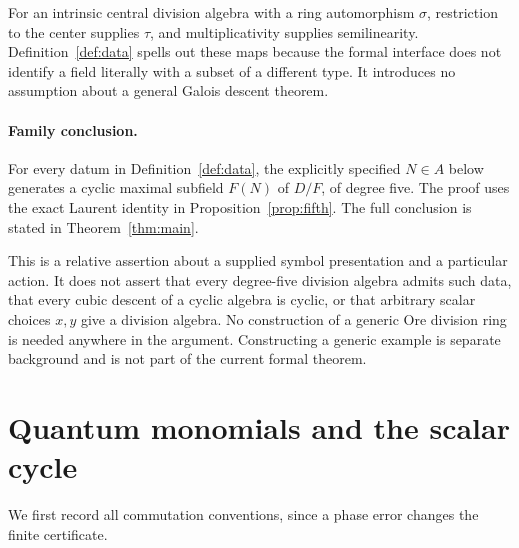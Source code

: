 \documentclass[11pt,letterpaper]{article}
\theoremstyle{definition}
\theoremstyle{remark}
\begin{document}
For an intrinsic central division algebra with a ring automorphism
$\sigma$, restriction to the center supplies $\tau$, and multiplicativity
supplies semilinearity. Definition~\ref{def:data} spells out these maps
because the formal interface does not identify a field literally with a
subset of a different type. It introduces no assumption about a general
Galois descent theorem.

\paragraph{Family conclusion.}
For every datum in Definition~\ref{def:data}, the explicitly specified
$N\in A$ below generates a cyclic maximal subfield $F(N)$ of $D/F$, of
degree five. The proof uses the exact Laurent identity in
Proposition~\ref{prop:fifth}. The full conclusion is stated in
Theorem~\ref{thm:main}.

This is a relative assertion about a supplied symbol presentation and a
particular action. It does not assert that every degree-five division
algebra admits such data, that every cubic descent of a cyclic algebra is
cyclic, or that arbitrary scalar choices $x,y$ give a division algebra.
No construction of a generic Ore division ring is needed anywhere in the
argument. Constructing a generic example is separate background and is not
part of the current formal theorem.

\section{Quantum monomials and the scalar cycle}\label{sec:monomials}

We first record all commutation conventions, since a phase error changes
the finite certificate.
\end{document}
